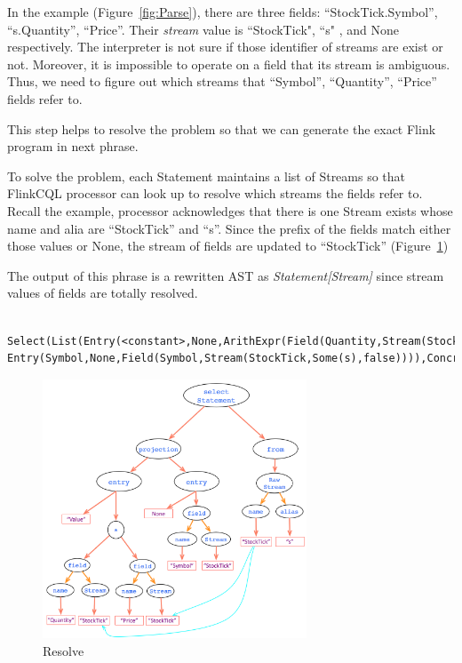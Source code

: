 In the example (Figure~\ref{fig:Parse}), there are three fields: ``StockTick.Symbol”, ``s.Quantity”, ``Price”. Their \textit{stream} value is ``StockTick", ``s" , and None respectively. The interpreter is not sure if those identifier of streams are exist or not. Moreover, it is impossible to operate on a field that its stream is ambiguous. Thus, we need to figure out  which streams that ``Symbol”, ``Quantity”, ``Price”  fields refer to.

This step helps to resolve the problem so that we can generate the exact Flink program in next phrase.

To solve the problem, each Statement maintains a list of Streams so that FlinkCQL processor can look up to resolve which streams the fields refer to. Recall the example, processor acknowledges that there is one Stream exists whose name and alia are ``StockTick'' and ``s''. Since the prefix of the fields match either those values or None, the stream of fields are updated to ``StockTick'' (Figure~\ref{fig:Resolve})

The output of this phrase is a rewritten AST as \textit{Statement[Stream]} since stream values of  fields are totally resolved.

\begin{lstlisting}
	Select(List(Entry(<constant>,None,ArithExpr(Field(Quantity,Stream(StockTick,Some(s),false)),*,Field(Price,Stream(StockTick,Some(s),false)))), Entry(Symbol,None,Field(Symbol,Stream(StockTick,Some(s),false)))),ConcreteStream(Stream(StockTick,Some(s),false),None,None),None,None)

\end{lstlisting}

\begin{figure}[h!] 
\centering    
\includegraphics[width=0.7\textwidth]{Resolve}
\caption{Resolve}
\label{fig:Resolve}
\end{figure}


